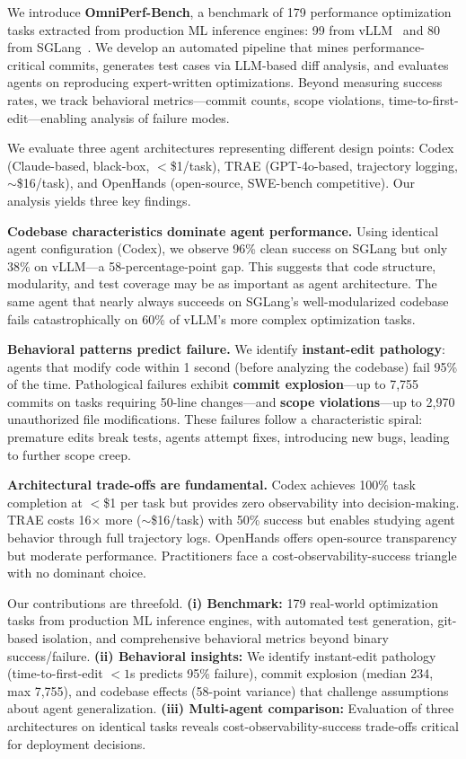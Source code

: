 \documentclass{article}
\theoremstyle{plain}
\theoremstyle{definition}
\theoremstyle{remark}
\begin{document}
We introduce \textbf{OmniPerf-Bench}, a benchmark of 179 performance optimization tasks extracted from production ML inference engines: 99 from vLLM~\citep{kwon2023vllm} and 80 from SGLang~\citep{zheng2023sglang}. We develop an automated pipeline that mines performance-critical commits, generates test cases via LLM-based diff analysis, and evaluates agents on reproducing expert-written optimizations. Beyond measuring success rates, we track behavioral metrics---commit counts, scope violations, time-to-first-edit---enabling analysis of failure modes.

We evaluate three agent architectures representing different design points: Codex (Claude-based, black-box, $<$\$1/task), TRAE (GPT-4o-based, trajectory logging, $\sim$\$16/task), and OpenHands (open-source, SWE-bench competitive). Our analysis yields three key findings.

\textbf{Codebase characteristics dominate agent performance.} Using identical agent configuration (Codex), we observe 96\% clean success on SGLang but only 38\% on vLLM---a 58-percentage-point gap. This suggests that code structure, modularity, and test coverage may be as important as agent architecture. The same agent that nearly always succeeds on SGLang's well-modularized codebase fails catastrophically on 60\% of vLLM's more complex optimization tasks.

\textbf{Behavioral patterns predict failure.} We identify \textbf{instant-edit pathology}: agents that modify code within 1 second (before analyzing the codebase) fail 95\% of the time. Pathological failures exhibit \textbf{commit explosion}---up to 7,755 commits on tasks requiring 50-line changes---and \textbf{scope violations}---up to 2,970 unauthorized file modifications. These failures follow a characteristic spiral: premature edits break tests, agents attempt fixes, introducing new bugs, leading to further scope creep.

\textbf{Architectural trade-offs are fundamental.} Codex achieves 100\% task completion at $<$\$1 per task but provides zero observability into decision-making. TRAE costs 16$\times$ more ($\sim$\$16/task) with 50\% success but enables studying agent behavior through full trajectory logs. OpenHands offers open-source transparency but moderate performance. Practitioners face a cost-observability-success triangle with no dominant choice.

Our contributions are threefold. \textbf{(i) Benchmark:} 179 real-world optimization tasks from production ML inference engines, with automated test generation, git-based isolation, and comprehensive behavioral metrics beyond binary success/failure. \textbf{(ii) Behavioral insights:} We identify instant-edit pathology (time-to-first-edit $<1$s predicts 95\% failure), commit explosion (median 234, max 7,755), and codebase effects (58-point variance) that challenge assumptions about agent generalization. \textbf{(iii) Multi-agent comparison:} Evaluation of three architectures on identical tasks reveals cost-observability-success trade-offs critical for deployment decisions.
\end{document}
